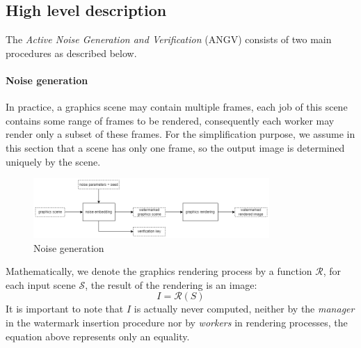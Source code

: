 

\subsection[Hight level description]{High level description}
The \emph{Active Noise Generation and Verification} (ANGV) consists of two main procedures as described below.

\paragraph[Noise generation]{Noise generation}
In practice, a graphics scene may contain multiple frames, each job of this scene contains some range of frames to be rendered, consequently each worker may render only a subset of these frames. For the simplification purpose, we assume in this section that a scene has only one frame, so the output image is determined uniquely by the scene.
\begin{figure}[h]
    \centering
    \includegraphics[width=0.8\textwidth]{noise_generation.png}
    \caption[Noise generation]{Noise generation}
    \label{fig:noise_generation}
\end{figure}
Mathematically, we denote the graphics rendering process by a function $\mathcal{R}$, for each input scene $\mathcal{S}$, the result of the rendering is an image:
\begin{equation*}
    I = \mathcal{R} \left( S \right)
\end{equation*}
It is important to note that $I$ is actually never computed, neither by the \emph{manager} in the watermark insertion procedure nor by \emph{workers} in rendering processes, the equation above represents only an equality.

